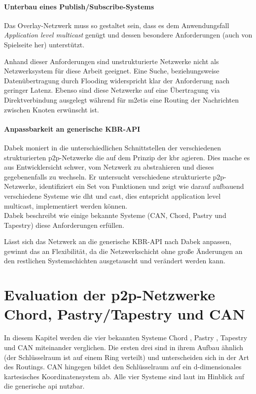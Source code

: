 \paragraph{Unterbau eines Publish/Subscribe-Systems} Das Overlay-Netzwerk muss so gestaltet sein, dass es dem Anwendungsfall \emph{Application level multicast} genügt und dessen besondere Anforderungen (auch von Spielseite her) unterstützt.

Anhand dieser Anforderungen sind unstrukturierte Netzwerke nicht als Netzwerksystem für diese Arbeit geeignet. Eine Suche, beziehungsweise Datenübertragung durch Flooding widerspricht klar der Anforderung nach geringer Latenz. Ebenso sind diese Netzwerke auf eine Übertragung via Direktverbindung ausgelegt während für \ac{m2etis} eine Routing der Nachrichten zwischen Knoten erwünscht ist.


\paragraph{Anpassbarkeit an generische KBR-API}
Dabek moniert in \cite{Dabek2003Towards} die unterschiedlichen Schnittstellen der verschiedenen strukturierten p2p-Netzwerke die auf dem Prinzip der \ac{kbr} agieren. Dies mache es aus Entwicklersicht schwer, vom Netzwerk zu abstrahieren und dieses gegebenenfalls zu wechseln. Er untersucht verschiedene strukturierte p2p-Netzwerke, identifiziert ein Set von Funktionen  und zeigt wie darauf aufbauend verschiedene Systeme wie \ac{dht} und \ac{cast}, dies entspricht application level multicast, implementiert werden können.\\
Dabek beschreibt wie einige bekannte Systeme (CAN, Chord, Pastry und Tapestry) diese Anforderungen erfüllen.

Lässt sich das Netzwerk an die generische KBR-API nach Dabek anpassen, gewinnt das an Flexibilität, da die Netzwerkschicht ohne große Änderungen an den restlichen Systemschichten ausgetauscht und verändert werden kann.

%

\section{Evaluation der p2p-Netzwerke Chord, Pastry/Tapestry und CAN}
In diesem Kapitel werden die vier bekannten Systeme Chord \cite{Stoica2003}, Pastry \cite{Rowstron2001}, Tapestry \cite{Zhao2001Tapestry,Zhao2004Tapestry} und CAN \cite{Ratnasamy2001Scalable} miteinander verglichen. Die ersten drei sind in ihrem Aufbau ähnlich (der Schlüsselraum ist auf einem Ring verteilt) und unterscheiden sich in der Art des Routings. CAN hingegen bildet den Schlüsselraum auf ein d-dimensionales kartesisches Koordinatensystem ab. Alle vier Systeme sind laut \cite{Dabek2003Towards} im Hinblick auf die generische \ac{api} nutzbar.

